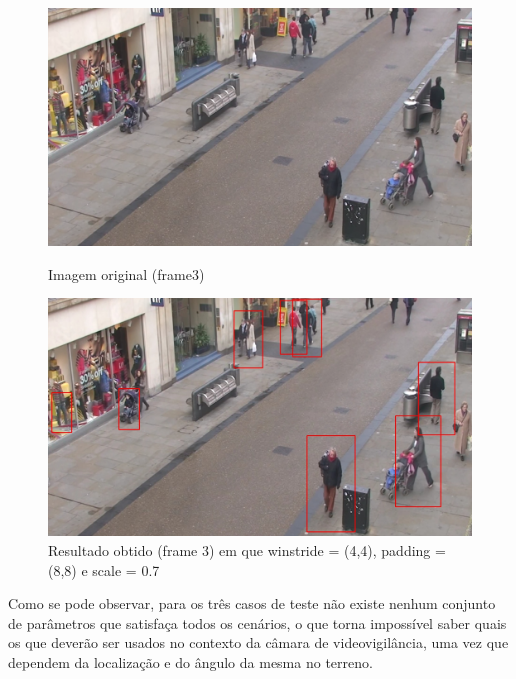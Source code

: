 \begin{figure}[h]
	\centering
	\begin{minipage}[b]{0.49\textwidth}
		\centering
		\includegraphics[width=\textwidth]{img/vision/exemplos/frame3.png}
		\caption[Imagem original (frame3)]{Imagem original (frame3) \newline \newline}
		\label{bluetth05-res}
	\end{minipage}
	\hfill
	\begin{minipage}[b]{0.49\textwidth}
		\centering
		\includegraphics[width=\textwidth]{img/vision/exemplos/result_frame3.jpg}
		\caption[Resultado obtido (frame 3)]{Resultado obtido (frame 3) em que winstride = (4,4), padding = (8,8) e scale = 0.7}
		\label{comimageesqu1ema}
	\end{minipage}
\end{figure}



Como se pode observar, para os três casos de teste não existe nenhum conjunto de parâmetros que satisfaça todos os cenários, o que torna impossível saber quais os que deverão ser usados no contexto da câmara de videovigilância, uma vez que dependem da localização e do ângulo da mesma no terreno. 


